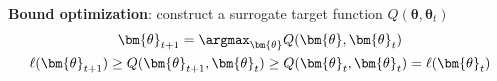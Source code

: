 

\textbf{Bound optimization}: construct a surrogate target function $Q(\bm{\theta},\bm{\theta}_{t})$
\begin{gather}
    \bm{\theta}_{t+1}=\argmax_{\bm{\theta}}{Q(\bm{\theta},\bm{\theta}_{t})}\\
    \ell(\bm{\theta}_{t+1})\geq Q(\bm{\theta}_{t+1},\bm{\theta}_{t})\geq Q(\bm{\theta}_{t},\bm{\theta}_{t})=\ell(\bm{\theta}_{t})
\end{gather}

